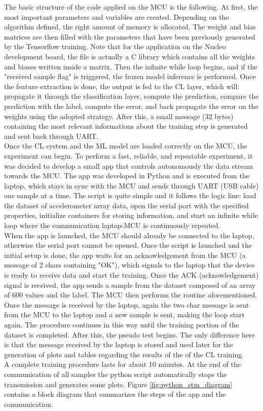 \documentclass[12pt]{report}
\begin{document}
The basic structure of the code applied on the MCU is the following. At first, the most important parameters and variables are created. Depending on the algorithm defined, the right amount of memory is allocated. The weight and bias matrices are then filled with the parameters that have been previously generated by the Tensorflow training. Note that for the application on the Nucleo development board, the file is actually a C library which contains all the weights and biases written inside a matrix. Then the infinite while loop begins, and if the "received sample flag" is triggered, the frozen model inference is performed. Once the feature extraction is done, the output is fed to the CL layer, which will: propagate it through the classification layer, compute the prediction, compare the prediction with the label, compute the error, and back propagate the error on the weights using the adopted strategy. After this, a small message (32 bytes) containing the most relevant informations about the training step is generated and sent back through UART.\\
Once the CL system and the ML model are loaded correctly on the MCU, the experiment can begin. To perform a fast, reliable, and repeatable experiment, it was decided to develop a small app that controls autonomously the data stream towards the MCU. The app was developed in Python and is executed from the laptop, which stays in sync with the MCU and sends through UART (USB cable) one sample at a time. The script is quite simple and it follows the logic line: load the dataset of accelerometer array data, open the serial port with the specified properties, initialize containers for storing information, and start an infinite while loop where the communication laptop-MCU is continuously repeated. \\
When the app is launched, the MCU should already be connected to the laptop, otherwise the serial port cannot be opened. Once the script is launched and the initial setup is done, the app waits for an acknowledgement from the MCU (a message of 2 chars containing "OK"), which signals to the laptop that the device is ready to receive data and start the training. Once the ACK (acknowledgement) signal is received, the app sends a sample from the dataset composed of an array of 600 values and the label. The MCU then performs the routine aforementioned. Once the message is received by the laptop, again the two char message is sent from the MCU to the laptop and a new sample is sent, making the loop start again. The procedure continues in this way until the training portion of the dataset is completed. After this, the pseudo test begins. The only difference here is that the message received by the laptop is stored and used later for the generation of plots and tables regarding the results of the of the CL training.\\
A complete training procedure lasts for about 10 minutes. At the end of the communication of all samples the python script automatically stops the transmission and generates some plots. Figure \ref{fig:python_stm_diagram} contains a block diagram that summarizes the steps of the app and the communication.
\end{document}

